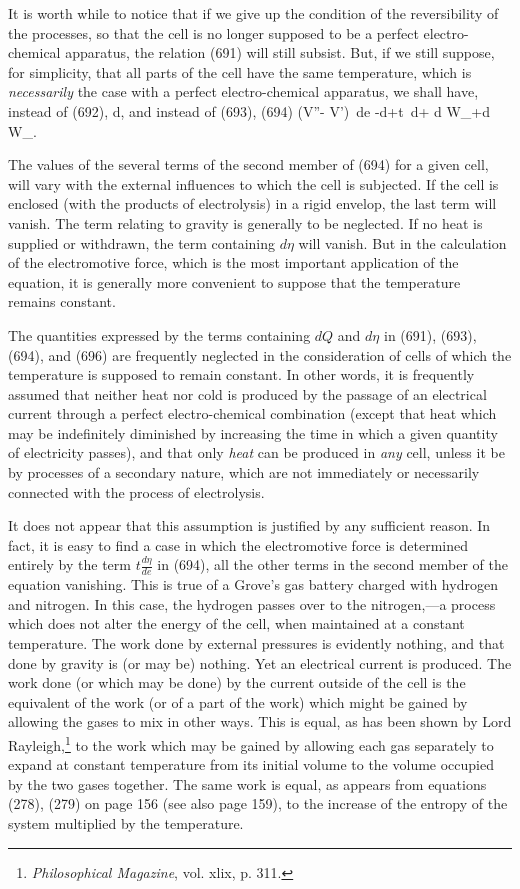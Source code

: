 \documentclass[12pt]{memoir}
\begin{document}
It is worth while to notice that if we give up the condition of the reversibility of the processes, so that the cell is no longer supposed to be a perfect electro-chemical apparatus, the relation (691) will still subsist. But, if we still suppose, for simplicity, that all parts of the cell have the same temperature, which is \textit{necessarily} the case with a perfect electro-chemical apparatus, we shall have, instead of (692),
\eqs d\eta \geq {},   \label{695} \eqe
and instead of (693), (694)
\eqs (V''- V')\, de \leq  -d\epsilon+t \,d\eta + d W_+d W_. \label{696} \eqe

The values of the several terms of the second member of (694) for a given cell, will vary with the external influences to which the cell is subjected. If the cell is enclosed (with the products of electrolysis) in a rigid envelop, the last term will vanish. The term relating to gravity is generally to be neglected.  If no heat is supplied or withdrawn, the term containing $d\eta$ will vanish. But in the calculation of the electromotive force, which is the most important application of the equation, it is generally more convenient to suppose that the temperature remains constant.

The quantities expressed by the terms containing $dQ$ and $d\eta$ in (691), (693), (694), and (696) are frequently neglected in the consideration of cells of which the temperature is supposed to remain constant. In other words, it is frequently assumed that neither heat nor cold is produced by the passage of an electrical current through a perfect electro-chemical combination (except that heat which may be indefinitely diminished by increasing the time in which a given quantity of electricity passes), and that only \textit{heat} can be produced in \textit{any} cell, unless it be by processes of a secondary nature, which are not immediately or necessarily connected with the process of electrolysis.

It does not appear that this assumption is justified by any sufficient reason. In fact, it is easy to find a case in which the electromotive force is determined entirely by the term $t\frac{d\eta}{de}$ in (694), all the other terms in the second member of the equation vanishing. This is true of a Grove's gas battery charged with hydrogen and nitrogen. In this case, the hydrogen passes over to the nitrogen,---a process which does not alter the energy of the cell, when maintained at a constant temperature. The work done by external pressures is evidently nothing, and that done by gravity is (or may be) nothing. Yet an electrical current is produced. The work done (or which may be done) by the current outside of the cell is the equivalent of the work (or of a part of the work) which might be gained by allowing the gases to mix in other ways. This is equal, as has been shown by Lord Rayleigh,\footnote{\textit{Philosophical Magazine}, vol. xlix, p. 311.} to the work which may be gained by allowing each gas separately to expand at constant temperature from its initial volume to the volume occupied by the two gases together. The same work is equal, as appears from equations (278), (279) on page 156 (see also page 159), to the increase of the entropy of the system multiplied by the temperature.
\end{document}

